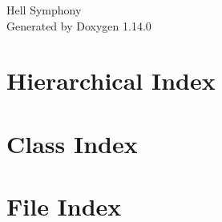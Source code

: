 \documentclass[twoside]{book}
\newcommand{\+}{\discretionary{\mbox{\scriptsize$\hookleftarrow$}}{}{}}
\newcommand{\clearemptydoublepage}{%
    \newpage{\pagestyle{empty}\cleardoublepage}%
  }
\begin{document}
  \raggedbottom
    \hypersetup{pageanchor=false,
                bookmarksnumbered=true,
                pdfencoding=unicode
               }
  \begin{titlepage}
  \vspace*{7cm}
  \begin{center}%
  {\Large Hell Symphony}\\
  \vspace*{1cm}
  {\large Generated by Doxygen 1.14.0}\\
  \end{center}
  \end{titlepage}
  \clearemptydoublepage
  \tableofcontents
  \clearemptydoublepage
  \hypersetup{pageanchor=true}
\chapter{Hierarchical Index}

\chapter{Class Index}

\chapter{File Index}

\end{document}
